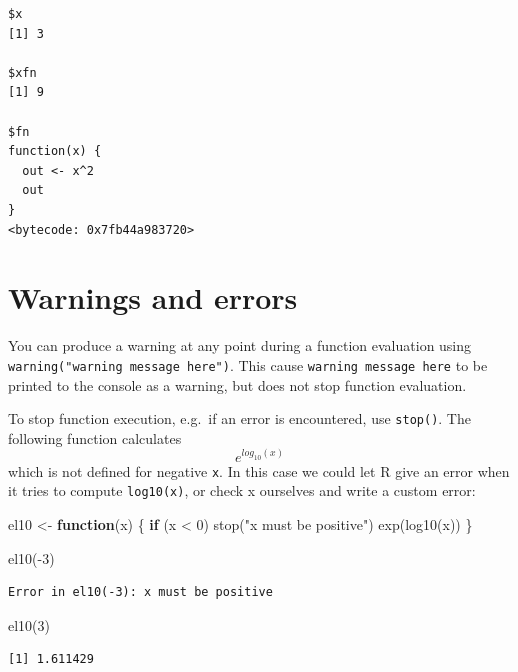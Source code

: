 \documentclass[
]{book}
\newenvironment{Shaded}{\begin{snugshade}}{\end{snugshade}}
\newcommand{\ControlFlowTok}[1]{\textcolor[rgb]{0.13,0.29,0.53}{\textbf{#1}}}
\newcommand{\DecValTok}[1]{\textcolor[rgb]{0.00,0.00,0.81}{#1}}
\newcommand{\FunctionTok}[1]{\textcolor[rgb]{0.00,0.00,0.00}{#1}}
\newcommand{\NormalTok}[1]{#1}
\newcommand{\OtherTok}[1]{\textcolor[rgb]{0.56,0.35,0.01}{#1}}
\newcommand{\SpecialCharTok}[1]{\textcolor[rgb]{0.00,0.00,0.00}{#1}}
\newcommand{\StringTok}[1]{\textcolor[rgb]{0.31,0.60,0.02}{#1}}
\begin{document}
\begin{verbatim}
$x
[1] 3

$xfn
[1] 9

$fn
function(x) {
  out <- x^2
  out
}
<bytecode: 0x7fb44a983720>
\end{verbatim}

\hypertarget{warnings-and-errors}{%
\section{Warnings and errors}\label{warnings-and-errors}}

You can produce a warning at any point during a function evaluation using \texttt{warning("warning\ message\ here")}. This cause \texttt{warning\ message\ here} to be printed to the console as a warning, but does not stop function evaluation.

To stop function execution, e.g.~if an error is encountered, use \texttt{stop()}. The following function calculates
\[ e^{log_{10}(x)} \]
which is not defined for negative \texttt{x}. In this case we could let R give an error when it tries to compute \texttt{log10(x)}, or check x ourselves and write a custom error:

\begin{Shaded}
\begin{Highlighting}[]
\NormalTok{el10 }\OtherTok{\textless{}{-}} \ControlFlowTok{function}\NormalTok{(x) \{}
  \ControlFlowTok{if}\NormalTok{ (x }\SpecialCharTok{\textless{}} \DecValTok{0}\NormalTok{) }\FunctionTok{stop}\NormalTok{(}\StringTok{"x must be positive"}\NormalTok{)}
  \FunctionTok{exp}\NormalTok{(}\FunctionTok{log10}\NormalTok{(x))}
\NormalTok{\}}

\FunctionTok{el10}\NormalTok{(}\SpecialCharTok{{-}}\DecValTok{3}\NormalTok{)}
\end{Highlighting}
\end{Shaded}

\begin{verbatim}
Error in el10(-3): x must be positive
\end{verbatim}

\begin{Shaded}
\begin{Highlighting}[]
\FunctionTok{el10}\NormalTok{(}\DecValTok{3}\NormalTok{)}
\end{Highlighting}
\end{Shaded}

\begin{verbatim}
[1] 1.611429
\end{verbatim}
\end{document}
